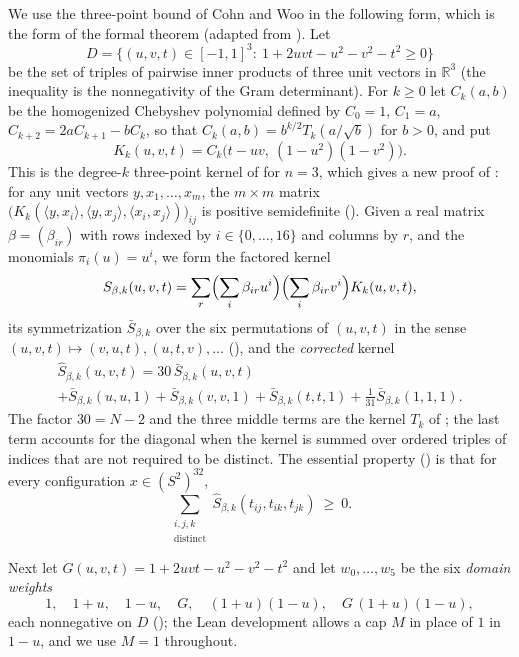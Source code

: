 \documentclass[11pt]{amsart}
\theoremstyle{definition}
\theoremstyle{remark}
\newcommand{\R}{\mathbb{R}}
\newcommand{\Sph}{S^{2}}
\newcommand{\ip}[2]{\langle #1,#2\rangle}
\begin{document}
We use the three-point bound of Cohn and Woo \cite[\S3]{CohnWoo2012} in the following form, which is the form of the formal theorem  (adapted from \cite{ThomsonN9,GrahamThomson102026}). Let
\[
  D=\{(u,v,t)\in[-1,1]^{3}:\ 1+2uvt-u^{2}-v^{2}-t^{2}\ge0\}
\]
be the set of triples of pairwise inner products of three unit vectors in $\R^{3}$ (the inequality is the nonnegativity of the Gram determinant). For $k\ge0$ let $C_k(a,b)$ be the homogenized Chebyshev polynomial defined by $C_0=1$, $C_1=a$, $C_{k+2}=2aC_{k+1}-bC_k$, so that $C_k(a,b)=b^{k/2}T_k(a/\sqrt b)$ for $b>0$, and put
\[
  K_k(u,v,t)=C_k\bigl(t-uv,\ (1-u^{2})(1-v^{2})\bigr).
\]
This is the degree-$k$ three-point kernel of \cite[Theorem~5]{CohnWoo2012} for $n=3$, which gives a new proof of \cite[Corollary~3.5]{BachocVallentin2008}: for any unit vectors $y,x_1,\dots,x_m$, the $m\times m$ matrix $\bigl(K_k(\ip{y}{x_i},\ip{y}{x_j},\ip{x_i}{x_j})\bigr)_{ij}$ is positive semidefinite (). Given a real matrix $\beta=(\beta_{ir})$ with rows indexed by $i\in\{0,\dots,16\}$ and columns by $r$, and the monomials $\pi_i(u)=u^{i}$, we form the factored kernel
\[
  S_{\beta,k}(u,v,t)=\sum_{r}\Bigl(\sum_{i}\beta_{ir}u^{i}\Bigr)\Bigl(\sum_{i}\beta_{ir}v^{i}\Bigr)K_k(u,v,t),
\]
its symmetrization $\bar S_{\beta,k}$ over the six permutations of $(u,v,t)$ in the sense $(u,v,t)\mapsto(v,u,t),(u,t,v),\dots$ (), and the \emph{corrected} kernel
\begin{multline*}
  \widehat S_{\beta,k}(u,v,t)=30\,\bar S_{\beta,k}(u,v,t)\\
  +\bar S_{\beta,k}(u,u,1)+\bar S_{\beta,k}(v,v,1)+\bar S_{\beta,k}(t,t,1)+\tfrac{1}{31}\bar S_{\beta,k}(1,1,1).
\end{multline*}
The factor $30=N-2$ and the three middle terms are the kernel $T_k$ of \cite[\S3]{CohnWoo2012}; the last term accounts for the diagonal when the kernel is summed over ordered triples of indices that are not required to be distinct. The essential property () is that for every configuration $x\in(\Sph)^{32}$,
\[
  \sum_{\substack{i,j,k\\ \text{distinct}}}\widehat S_{\beta,k}(t_{ij},t_{ik},t_{jk})\ \ge\ 0 .
\]

Next let $G(u,v,t)=1+2uvt-u^{2}-v^{2}-t^{2}$ and let $w_0,\dots,w_5$ be the six \emph{domain weights}
\[
  1,\quad 1+u,\quad 1-u,\quad G,\quad (1+u)(1-u),\quad G\,(1+u)(1-u),
\]
each nonnegative on $D$ (); the Lean development allows a cap $M$ in place of $1$ in $1-u$, and we use $M=1$ throughout.
\end{document}
